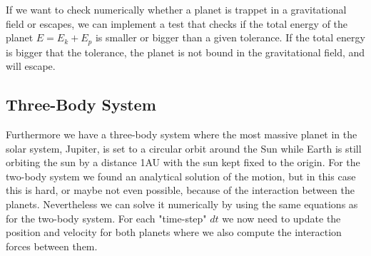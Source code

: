 \documentclass[norsk,a4paper,12pt]{article}
\begin{document}
If we want to check numerically whether a planet is trappet in a gravitational field or escapes, we can implement a test that checks if the total energy of the planet $E = E_k + E_p$ is smaller or bigger than a given tolerance. If the total energy is bigger that the tolerance, the planet is not bound in the gravitational field, and will escape.

\subsection{Three-Body System}
Furthermore we have a three-body system where the most massive planet in the solar system, Jupiter, is set to a circular orbit around the Sun while Earth is still orbiting the sun by a distance 1AU with the sun kept fixed to the origin. For the two-body system we found an analytical solution of the motion, but in this case this is hard, or maybe not even possible, because of the interaction between the planets. Nevertheless we can solve it numerically by using the same equations as for the two-body system. For each "time-step" $dt$ we now need to update the position and velocity for both planets where we also compute the interaction forces between them. 
\end{document}
